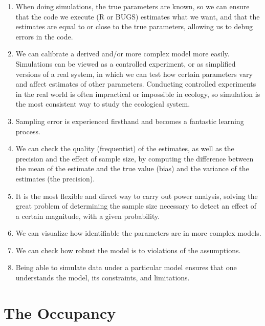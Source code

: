 \documentclass[
]{book}
\providecommand{\tightlist}{%
  \setlength{\itemsep}{0pt}\setlength{\parskip}{0pt}}
\begin{document}
\begin{enumerate}
\def\labelenumi{\arabic{enumi}.}
\tightlist
\item
  When doing simulations, the true parameters are known, so we can ensure that the code we execute (R or BUGS) estimates what we want, and that the estimates are equal to or close to the true parameters, allowing us to debug errors in the code.
\item
  We can calibrate a derived and/or more complex model more easily. Simulations can be viewed as a controlled experiment, or as simplified versions of a real system, in which we can test how certain parameters vary and affect estimates of other parameters. Conducting controlled experiments in the real world is often impractical or impossible in ecology, so simulation is the most consistent way to study the ecological system.
\item
  Sampling error is experienced firsthand and becomes a fantastic learning process.
\item
  We can check the quality (frequentist) of the estimates, as well as the precision and the effect of sample size, by computing the difference between the mean of the estimate and the true value (bias) and the variance of the estimates (the precision).
\item
  It is the most flexible and direct way to carry out power analysis, solving the great problem of determining the sample size necessary to detect an effect of a certain magnitude, with a given probability.
\item
  We can visualize how identifiable the parameters are in more complex models.
\item
  We can check how robust the model is to violations of the assumptions.
\item
  Being able to simulate data under a particular model ensures that one understands the model, its constraints, and limitations.
\end{enumerate}

\hypertarget{occu}{%
\chapter{The Occupancy}\label{occu}}
\end{document}
